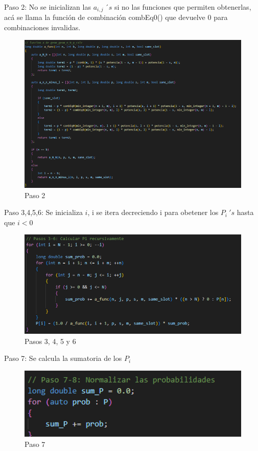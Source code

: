 \documentclass{article}
\begin{document}
Paso 2: No se inicializan las $a_{i,j}\ ´s$ si no las funciones que permiten obtenerlas, acá se llama la función de combinación combEq0() que devuelve 0 para combinaciones invalidas.
\begin{figure}[H]
    \centering
    \includegraphics[width=0.75\linewidth]{images/imageGeoGeoMCalc6.png}
    \caption{Paso 2}
    \label{fig:enter-label}
\end{figure}

Paso 3,4,5,6: Se inicializa $i$, i se itera decreciendo i para obetener los $P_i \ 's$ hasta que $i<0$

\begin{figure}[H]
    \centering
    \includegraphics[width=0.75\linewidth]{images/imageGeoGeoMCalc7.png}
    \caption{Pasos 3, 4, 5 y 6}
    \label{fig:enter-label}
\end{figure}

Paso 7: Se calcula la sumatoria de los $P_i$
\begin{figure}[H]
    \centering
    \includegraphics[width=0.5\linewidth]{images/imageGeoGeoMCalc8.png}
    \caption{Paso 7}
    \label{fig:enter-label}
\end{figure}
\end{document}
